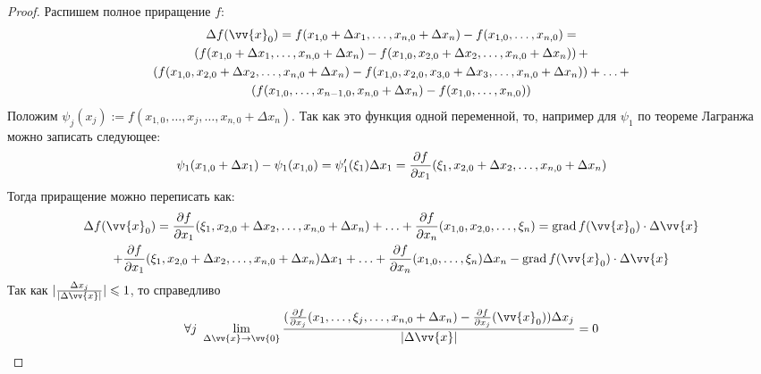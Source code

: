 \begin{proof}
	Распишем полное приращение $f$:
	\begin{multline*}
		\Delta f(\vv{x}_0) = f(x_{1, 0} + \Delta x_1, \ldots, x_{n, 0} + \Delta x_n) - f(x_{1, 0}, \ldots, x_{n, 0}) =
		\\
		\left(f(x_{1, 0} + \Delta x_1, \ldots, x_{n, 0} + \Delta x_n) - f(x_{1, 0}, x_{2, 0} + \Delta x_2, \ldots, x_{n, 0} + \Delta x_n)\right) +
		\\
		\left(f(x_{1, 0}, x_{2, 0} + \Delta x_2, \ldots, x_{n, 0} + \Delta x_n) - f(x_{1, 0}, x_{2, 0}, x_{3, 0} + \Delta x_3, \ldots, x_{n, 0} + \Delta x_n)\right) + \ldots +
		\\
		\left(f(x_{1, 0}, \ldots, x_{n - 1, 0}, x_{n, 0} + \Delta x_n) - f(x_{1, 0}, \ldots, x_{n, 0})\right)
	\end{multline*}
	Положим $\psi_j(x_j) := f(x_{1, 0}, \ldots, x_j, \ldots, x_{n, 0} + \Delta x_n)$. Так как это функция одной переменной, то, например для $\psi_1$ по теореме Лагранжа можно записать следующее:
	\[
		\psi_1(x_{1, 0} + \Delta x_1) - \psi_1(x_{1, 0}) = \psi'_1(\xi_1)\Delta x_1 = \frac{\partial f}{\partial x_1}(\xi_1, x_{2, 0} + \Delta x_2, \ldots, x_{n, 0} + \Delta x_n)
	\]
	Тогда приращение можно переписать как:
	\begin{multline*}
		\Delta f(\vv{x}_0) = \frac{\vdelta f}{\vdelta x_1}(\xi_1, x_{2, 0} + \Delta x_2, \ldots, x_{n, 0} + \Delta x_n) + \ldots + \frac{\vdelta f}{\vdelta x_n}(x_{1, 0}, x_{2, 0}, \ldots, \xi_n) = 
		\grad f(\vv{x}_0)\cdot \Delta\vv{x}\\
		+ \frac{\vdelta f}{\vdelta x_1}(\xi_1, x_{2, 0} + \Delta x_2, \ldots, x_{n, 0} + \Delta x_n) \Delta x_1 + \ldots + \frac{\vdelta f}{\vdelta x_n}(x_{1, 0}, \ldots, \xi_n)\Delta x_n - \grad f(\vv{x}_0)\cdot \Delta\vv{x}
	\end{multline*}
	Так как $|\frac{\Delta x_j}{|\Delta \vv{x}|}| \leq 1$, то справедливо
	\[
		\forall j \ \liml_{\Delta\vv{x} \to \vv{0}}\frac{(\frac{\vdelta f}{\vdelta x_j}(x_1, \ldots, \xi_j, \ldots, x_{n, 0} + \Delta x_n) - \frac{\vdelta f}{\vdelta x_j}(\vv{x}_0)) \Delta x_j}{|\Delta \vv{x}|} = 0
	\]
\end{proof}
